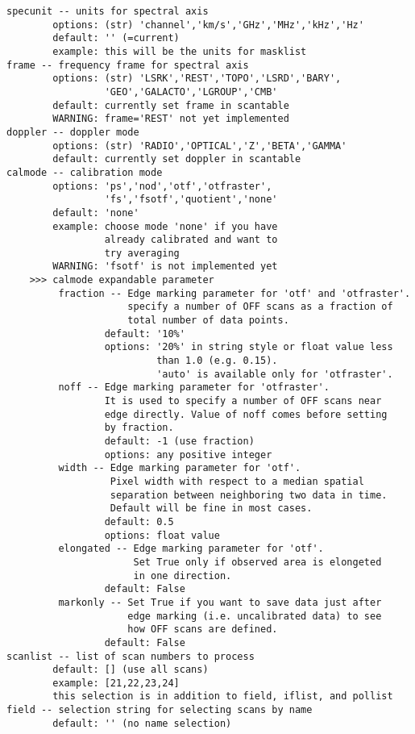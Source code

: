 \begin{verbatim}
specunit -- units for spectral axis
        options: (str) 'channel','km/s','GHz','MHz','kHz','Hz'
        default: '' (=current)
        example: this will be the units for masklist
frame -- frequency frame for spectral axis
        options: (str) 'LSRK','REST','TOPO','LSRD','BARY',
                 'GEO','GALACTO','LGROUP','CMB'
        default: currently set frame in scantable
        WARNING: frame='REST' not yet implemented
doppler -- doppler mode
        options: (str) 'RADIO','OPTICAL','Z','BETA','GAMMA'
        default: currently set doppler in scantable
calmode -- calibration mode
        options: 'ps','nod','otf','otfraster',
                 'fs','fsotf','quotient','none'
        default: 'none'
        example: choose mode 'none' if you have
                 already calibrated and want to
                 try averaging
        WARNING: 'fsotf' is not implemented yet
    >>> calmode expandable parameter
         fraction -- Edge marking parameter for 'otf' and 'otfraster'.
                     specify a number of OFF scans as a fraction of 
                     total number of data points. 
                 default: '10%'
                 options: '20%' in string style or float value less 
                          than 1.0 (e.g. 0.15).
                          'auto' is available only for 'otfraster'. 
         noff -- Edge marking parameter for 'otfraster'.
                 It is used to specify a number of OFF scans near 
                 edge directly. Value of noff comes before setting 
                 by fraction.
                 default: -1 (use fraction)
                 options: any positive integer
         width -- Edge marking parameter for 'otf'.
                  Pixel width with respect to a median spatial 
                  separation between neighboring two data in time.
                  Default will be fine in most cases.
                 default: 0.5
                 options: float value
         elongated -- Edge marking parameter for 'otf'.
                      Set True only if observed area is elongeted 
                      in one direction.
                 default: False
         markonly -- Set True if you want to save data just after 
                     edge marking (i.e. uncalibrated data) to see 
                     how OFF scans are defined.
                 default: False
scanlist -- list of scan numbers to process
        default: [] (use all scans)
        example: [21,22,23,24]
        this selection is in addition to field, iflist, and pollist
field -- selection string for selecting scans by name
        default: '' (no name selection)

\end{verbatim}
